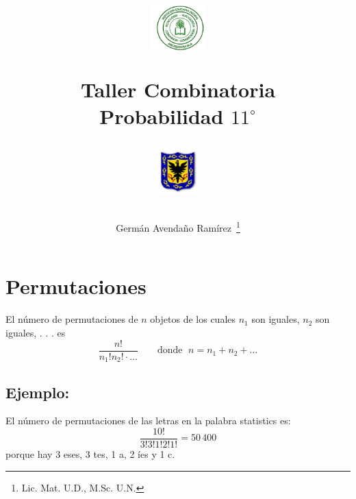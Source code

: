\documentclass[10pt,twoside]{article}
\author{Germ\'an Avenda\~no Ram\'irez~\thanks{Lic. Mat. U.D., M.Sc. U.N.}}
\title{\begin{minipage}{.2\textwidth}
\includegraphics[height=1.75cm]{Images/logo-colegio.png}\end{minipage}
\begin{minipage}{.55\textwidth}
\begin{center}
Taller Combinatoria\\
Probabilidad $11^{\circ}$
\end{center}
\end{minipage}\hfill
\begin{minipage}{.2\textwidth}
\includegraphics[height=1.75cm]{Images/logo-sed.png} 
\end{minipage}}
\date{}
\begin{document}
\maketitle
\section*{Permutaciones}
El número de permutaciones de $n$ objetos de los cuales $n_{1}$ son iguales, $n_{2}$ son iguales, . . . es
\[\dfrac{n!}{n_{1}!n_{2}!\cdot \ldots} \qquad \text{donde }\; n=n_{1}+n_{2}+\ldots\]
\subsection*{Ejemplo:}
El número de permutaciones de las letras en la palabra statistics es:
\[\dfrac{10!}{3!3!1!2!1!}=50\,400\] porque hay 3 eses, 3 tes, 1 a, 2 íes y 1 c.
\end{document}
